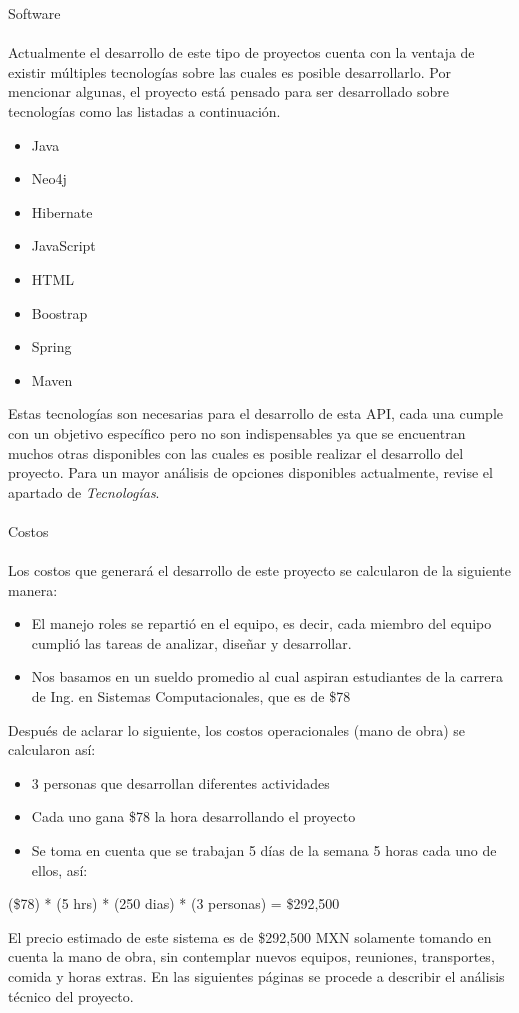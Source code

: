 \newpage
Software  
\\\\
Actualmente el desarrollo de este tipo de proyectos cuenta con la ventaja de existir múltiples tecnologías sobre las cuales es posible desarrollarlo. Por mencionar algunas, el proyecto está pensado para ser desarrollado sobre tecnologías como las listadas a continuación.
\begin{itemize}
	\item Java
	\item Neo4j
	\item Hibernate
	\item JavaScript
	\item HTML
	\item Boostrap
	\item Spring
	\item Maven
\end{itemize}
Estas tecnologías son necesarias para el desarrollo de esta API, cada una cumple con un objetivo específico pero no son indispensables ya que se encuentran muchos otras disponibles con las cuales es posible realizar el desarrollo del proyecto. Para un mayor análisis de opciones disponibles actualmente, revise el apartado de \emph{Tecnologías}.
\\\\
Costos 
\\\\
Los costos que generará el desarrollo de este proyecto se calcularon de la siguiente manera: 
\begin{itemize}
	\item El manejo roles se repartió en el equipo, es decir, cada miembro del equipo cumplió las tareas de analizar, diseñar y desarrollar.  
	\item Nos basamos en un sueldo promedio al cual aspiran estudiantes de la carrera de 
	      Ing. en Sistemas Computacionales, que es de \$78
\end{itemize}
Después de aclarar lo siguiente, los costos operacionales (mano de obra) se calcularon así:
\begin{itemize}
	\item 3 personas que desarrollan diferentes actividades 
	\item Cada uno gana \$78 la hora desarrollando el proyecto
	\item Se toma en cuenta que se trabajan 5 días de la semana 5 horas cada uno de ellos, así: 
\end{itemize}
(\$78) * (5 hrs) * (250 dias) * (3 personas) = \$292,500
 
El precio estimado de este sistema es de \$292,500 MXN solamente tomando en cuenta la mano de obra, sin contemplar nuevos equipos, reuniones, transportes, comida y horas extras. En las siguientes páginas se procede a describir el análisis técnico del proyecto.
\newpage
